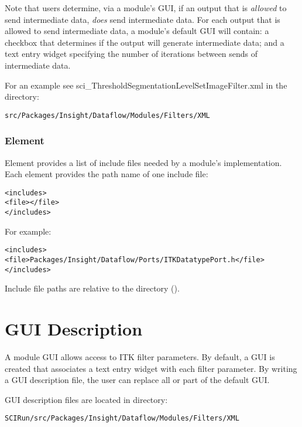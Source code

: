 Note that users determine, via a module's GUI, if an output that is
\emph{allowed} to send intermediate data, \emph{does} send
intermediate data.  For each output that is allowed to send
intermediate data, a module's default GUI will contain: a checkbox
that determines if the output will generate intermediate data; and a
text entry widget specifying the number of iterations between
sends of intermediate data.

For an example see sci\_ThresholdSegmentationLevelSetImageFilter.xml in
the directory:

\begin{alltt}
  src/Packages/Insight/Dataflow/Modules/Filters/XML
\end{alltt}

\subsubsection{Element }

Element  provides a list of include files needed
by a module's implementation.  Each  element
provides the path name of one include file:

\begin{alltt}
  <includes>
    <file></file>
    \velide
  </includes>
\end{alltt}

For example:

\begin{alltt}
  <includes>
    <file>Packages/Insight/Dataflow/Ports/ITKDatatypePort.h</file>
  </includes>
\end{alltt}

Include file paths are relative to the \sr{}  directory
().

\section{\sr{} GUI Description}
\label{sec:itk_mods:sr_gui_desc}

A module GUI allows access to ITK filter parameters.  By default, a
GUI is created that associates a text entry widget with each filter
parameter.  By writing a GUI description file, the user can replace
all or part of the default GUI.  

\sr{} GUI description files are located in directory:

\begin{alltt}
  SCIRun/src/Packages/Insight/Dataflow/Modules/Filters/XML
\end{alltt}

